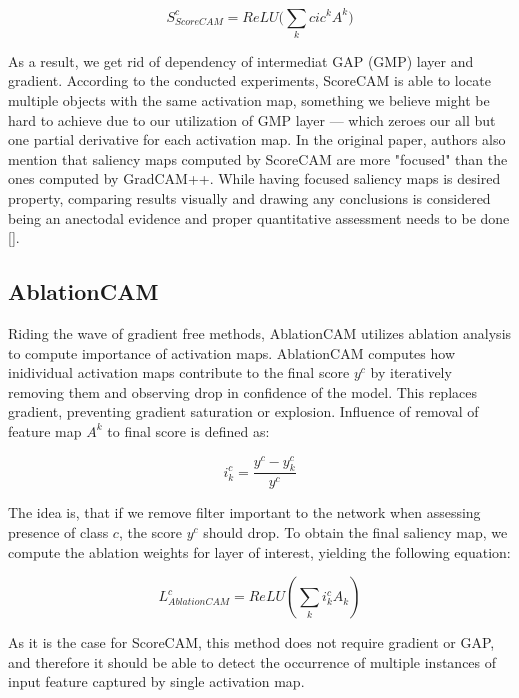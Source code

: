 \begin{equation}
    S_{ScoreCAM}^c = ReLU\biggl(\sum_k cic^k A^k\biggr)
\end{equation}


As a result, we get rid of dependency of intermediat GAP (GMP) layer and gradient. According to the conducted experiments, ScoreCAM is able to locate multiple objects with the same activation map, something we believe might be hard to achieve due to our utilization of GMP layer --- which zeroes our all but one partial derivative for each activation map. In the original paper, authors also mention that saliency maps computed by ScoreCAM are more "focused" than the ones computed by GradCAM++. While having focused saliency maps is desired property, comparing results visually and drawing any conclusions is considered being an anectodal evidence and proper quantitative assessment needs to be done [].


\subsection{AblationCAM}


Riding the wave of gradient free methods, AblationCAM utilizes ablation analysis to compute importance of activation maps. AblationCAM computes how inidividual activation maps contribute to the final score $y^c$ by iteratively removing them and observing drop in confidence of the model. This replaces gradient, preventing gradient saturation or explosion. Influence of removal of feature map $A^k$ to final score is defined as:


\begin{equation}
    i^c_k = \frac{y^c - y^c_k}{y^c}
\end{equation}

The idea is, that if we remove filter important to the network when assessing presence of class $c$, the score $y^c$ should drop. To obtain the final saliency map, we compute the ablation weights for layer of interest, yielding the following equation:

\begin{equation}
    L^c_{AblationCAM} = ReLU(\sum_k i^c_k A_k)
\end{equation}

As it is the case for ScoreCAM, this method does not require gradient or GAP, and therefore it should be able to detect the occurrence of multiple instances of input feature captured by single activation map.

